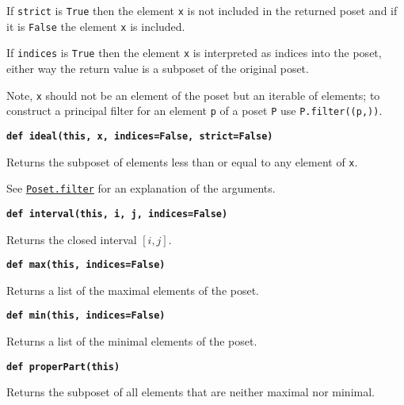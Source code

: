 \documentclass[12pt]{article}
\begin{document}
\begin{child}
{{If \verb|strict| is \verb|True| then the element \verb|x| is not included in the returned poset and
if it is \verb|False| the element \verb|x| is included.

If \verb|indices| is \verb|True| then the element \verb|x| is interpreted as indices into the poset,
either way the return value is a subposet of the original poset.

Note, \verb|x| should not be an element of the poset but an iterable of elements; to construct a principal
filter for an element \verb|p| of a poset \verb|P| use \verb|P.filter((p,))|.


}\endlist}

\textbf{\hypertarget{Poset.ideal}{\texttt{def ideal(this, x, indices=False, strict=False)}}}
{\list{}{\leftmargin 0.5cm}\item{
Returns the subposet of elements less than or equal to any element of \verb|x|.

See \hyperlink{Poset.filter}{\texttt{Poset.filter}} for an explanation of the arguments.


}\endlist}

\textbf{\hypertarget{Poset.interval}{\texttt{def interval(this, i, j, indices=False)}}}
{\list{}{\leftmargin 0.5cm}\item{
Returns the closed interval $[i,j]$.


}\endlist}

\textbf{\hypertarget{Poset.max}{\texttt{def max(this, indices=False)}}}
{\list{}{\leftmargin 0.5cm}\item{
Returns a list of the maximal elements of the poset.


}\endlist}

\textbf{\hypertarget{Poset.min}{\texttt{def min(this, indices=False)}}}
{\list{}{\leftmargin 0.5cm}\item{
Returns a list of the minimal elements of the poset.


}\endlist}

\textbf{\hypertarget{Poset.properPart}{\texttt{def properPart(this)}}}
{\list{}{\leftmargin 0.5cm}\item{
Returns the subposet of all elements that are neither maximal nor minimal.


}}
\end{child}
\end{document}

